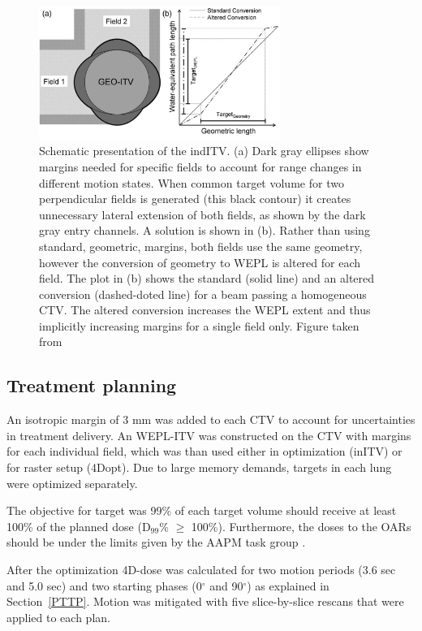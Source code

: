 \documentclass[type=dr, dr=rernat, accentcolor=tud7b,colorbacktitle, bigchapter, openright, twoside, 12pt ]{tudthesis}
\begin{document}
\begin{figure}[H]
	\begin{center}
		\includegraphics[width=0.7\textwidth]{./Images/weplITV.png}
		\caption{Schematic presentation of the indITV. (a) Dark gray ellipses show margins needed for specific fields to account for range changes in different motion states.
		When common target volume for two perpendicular fields is generated (this black contour) it creates unnecessary lateral extension of both fields, as shown by the dark gray
		entry channels. A solution is shown in (b). Rather than using standard, geometric, margins, both fields use the same geometry, however the conversion of geometry to WEPL
		is altered for each field. The plot in (b) shows the standard (solid line) and an altered conversion (dashed-doted line) for a beam passing a homogeneous CTV. The altered conversion
		increases the WEPL extent and thus implicitly increasing margins for a single field only. Figure taken from \cite{Graeff2012}}
		\label{Fig:weplITV}
	\end{center}
\end{figure}

\subsection{Treatment planning}

An isotropic margin of 3 mm was added to each CTV to account for uncertainties in treatment delivery. An WEPL-ITV was constructed on the CTV with margins for each individual field, which was than used either in optimization (inITV)
or for raster setup (4Dopt). Due to large memory demands, targets in each lung were optimized separately. 
  
The objective for target was 99\% of each target volume should receive at least 100\% of the planned dose (D$_{99}$\% $\geq$ 100\%). Furthermore, the doses to the OARs should be under the limits given by the AAPM task group \cite{Benedict2010}. 
 
After the optimization 4D-dose was calculated for two motion periods (3.6 sec and 5.0 sec) and two starting phases (0$^\circ$ and 90$^\circ$) as explained in Section~\ref{PTTP}. Motion was mitigated with five 
slice-by-slice rescans that were applied to each plan.
\end{document}
